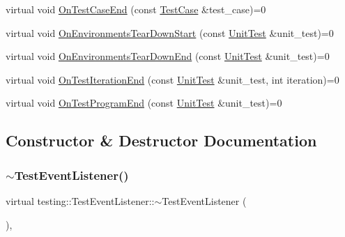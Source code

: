 \begin{DoxyCompactItemize}
virtual void \mbox{\hyperlink{classtesting_1_1_test_event_listener_ae61985e2ef76ac78379b077be57a9c36}{On\+Test\+Case\+End}} (const \mbox{\hyperlink{classtesting_1_1_test_case}{Test\+Case}} \&test\+\_\+case)=0
\item 
virtual void \mbox{\hyperlink{classtesting_1_1_test_event_listener_a468b5e6701bcb86cb2c956caadbba5e4}{On\+Environments\+Tear\+Down\+Start}} (const \mbox{\hyperlink{classtesting_1_1_unit_test}{Unit\+Test}} \&unit\+\_\+test)=0
\item 
virtual void \mbox{\hyperlink{classtesting_1_1_test_event_listener_a9ea04fa7f447865ba76df35e12ba2092}{On\+Environments\+Tear\+Down\+End}} (const \mbox{\hyperlink{classtesting_1_1_unit_test}{Unit\+Test}} \&unit\+\_\+test)=0
\item 
virtual void \mbox{\hyperlink{classtesting_1_1_test_event_listener_a550fdb3e55726e4cefa09f5697941425}{On\+Test\+Iteration\+End}} (const \mbox{\hyperlink{classtesting_1_1_unit_test}{Unit\+Test}} \&unit\+\_\+test, int iteration)=0
\item 
virtual void \mbox{\hyperlink{classtesting_1_1_test_event_listener_ad15b6246d94c268e233487a86463ef3d}{On\+Test\+Program\+End}} (const \mbox{\hyperlink{classtesting_1_1_unit_test}{Unit\+Test}} \&unit\+\_\+test)=0
\end{DoxyCompactItemize}


\subsection{Constructor \& Destructor Documentation}
\mbox{\label{classtesting_1_1_test_event_listener_a4512d19e7a108ec4926239ec1ea85d63}} 
\subsubsection{\texorpdfstring{$\sim$TestEventListener()}{~TestEventListener()}}
{\footnotesize\ttfamily virtual testing\+::\+Test\+Event\+Listener\+::$\sim$\+Test\+Event\+Listener (\begin{DoxyParamCaption}{ }\end{DoxyParamCaption})\hspace{0.3cm}{\ttfamily [inline]}, {\ttfamily [virtual]}}




